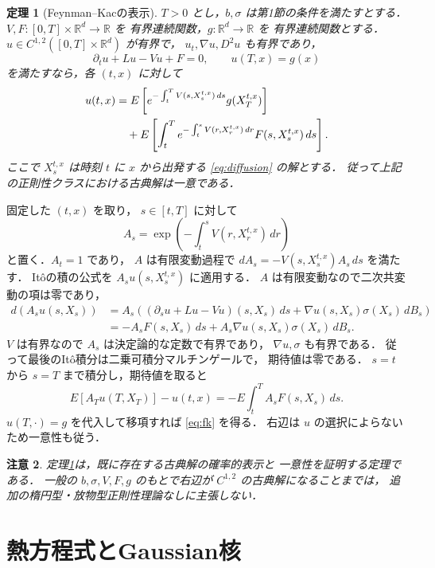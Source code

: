 \documentclass[a5paper,10pt,onecolumn]{jsarticle}
\makeatletter
\theoremstyle{mathnotetheorem}
\newtheorem{theorem}{定理}[section]
\newtheorem{remark}[theorem]{注意}
\renewcommand{\proofname}{証明}
\renewenvironment{proof}[1][\proofname]{%
  \par\pushQED{\qed}\normalfont\topsep4\p@\@plus2\p@\relax
  \trivlist\item[\hskip\labelsep\bfseries #1]\ignorespaces
}{\popQED\endtrivlist\@endpefalse}
\makeatother
\begin{document}
\begin{theorem}[Feynman--Kacの表示]\label{thm:fk}
$T>0$ とし，$b,\sigma$ は第1節の条件を満たすとする．
$V,F:[0,T]\times\mathbb R^d\to\mathbb R$ を
有界連続関数，$g:\mathbb R^d\to\mathbb R$ を
有界連続関数とする．
$u\in C^{1,2}([0,T]\times\mathbb R^d)$ が有界で，
$u_t,\nabla u,D^2u$ も有界であり，
\[
 \partial_tu+Lu-Vu+F=0,\qquad
 u(T,x)=g(x)
\]
を満たすなら，各 $(t,x)$ に対して
\begin{align}
 u(t,x)
 &=E\left[
 e^{-\int_t^TV(s,X_s^{t,x})\,ds}
    g(X_T^{t,x})\right]\notag\\
 &\quad+
 E\left[\int_t^T
  e^{-\int_t^sV(r,X_r^{t,x})\,dr}
  F(s,X_s^{t,x})\,ds\right].
 \label{eq:fk}
\end{align}
ここで $X_s^{t,x}$ は時刻 $t$ に $x$ から出発する
\eqref{eq:diffusion} の解とする．
従って上記の正則性クラスにおける古典解は一意である．
\end{theorem}
\begin{proof}
固定した $(t,x)$ を取り，
$s\in[t,T]$ に対して
\[
 A_s=\exp\!\left(-\int_t^sV(r,X_r^{t,x})\,dr\right)
\]
と置く．$A_t=1$ であり，
$A$ は有限変動過程で
$dA_s=-V(s,X_s^{t,x})A_s\,ds$ を満たす．
It\^oの積の公式を
$A_su(s,X_s^{t,x})$ に適用する．
$A$ は有限変動なので二次共変動の項は零であり，
\begin{align*}
 d(A_su(s,X_s))
 &=A_s\left(
 (\partial_su+Lu-Vu)(s,X_s)\,ds
 +\nabla u(s,X_s)\sigma(X_s)\,dB_s
 \right)\\
 &=-A_sF(s,X_s)\,ds+
 A_s\nabla u(s,X_s)\sigma(X_s)\,dB_s.
\end{align*}
$V$ は有界なので $A_s$ は決定論的な定数で有界であり，
$\nabla u,\sigma$ も有界である．
従って最後のIt\^o積分は二乗可積分マルチンゲールで，
期待値は零である．
$s=t$ から $s=T$ まで積分し，期待値を取ると
\[
 E[A_Tu(T,X_T)]-u(t,x)
 =-E\int_t^TA_sF(s,X_s)\,ds.
\]
$u(T,\cdot)=g$ を代入して移項すれば
\eqref{eq:fk} を得る．
右辺は $u$ の選択によらないため一意性も従う．
\end{proof}

\begin{remark}
定理\ref{thm:fk}は，既に存在する古典解の確率的表示と
一意性を証明する定理である．
一般の $b,\sigma,V,F,g$ のもとで右辺が
$C^{1,2}$ の古典解になることまでは，
追加の楕円型・放物型正則性理論なしに主張しない．
\end{remark}

\section{熱方程式とGaussian核}
\end{document}
